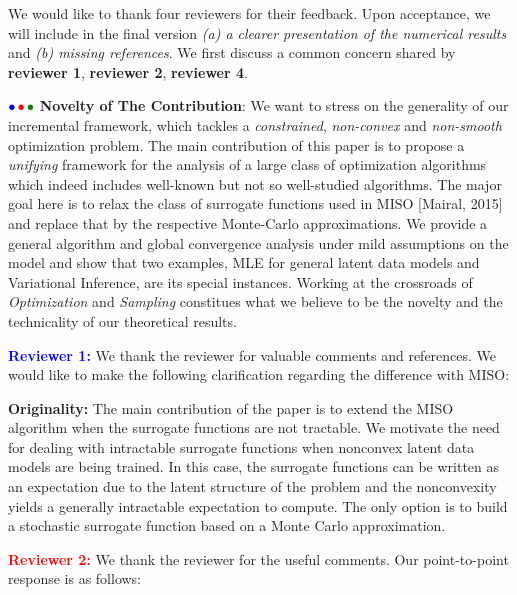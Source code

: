 \documentclass{article}
\begin{document}
We would like to thank four reviewers for their feedback. Upon acceptance, we will include in the final version \emph{{\sf (a)} a clearer presentation of the numerical results} and \emph{{\sf (b)} missing references}. 
We first discuss a common concern shared by \textbf{\color{blue}reviewer 1}, \textbf{\color{red} reviewer 2}, \textbf{\color{green!50!black}reviewer 4}.

${\color{blue}\bullet}\!~{\color{red}\bullet}\!~{\color{green!50!black}\bullet}$ \textbf{Novelty of The Contribution}: 
We want to stress on the generality of our incremental framework, which tackles a \emph{constrained}, \emph{non-convex} and \emph{non-smooth} optimization problem. 
The main contribution of this paper is to propose a \emph{unifying} framework for the analysis of a large class of optimization algorithms which indeed includes well-known but not so well-studied algorithms.
The major goal here is to relax the class of surrogate functions used in MISO [Mairal, 2015] and replace that by the respective Monte-Carlo approximations.
We provide a general algorithm and global convergence analysis under mild assumptions on the model and show that two examples, MLE for general latent data models and Variational Inference, are its special instances.
Working at the crossroads of \emph{Optimization} and \emph{Sampling} constitues what we believe to be the novelty and the technicality of our theoretical results.\vspace{-0.05in}


\textbf{\textcolor{blue}{Reviewer 1:}} We thank the reviewer for valuable comments and references. We would like to make the following clarification regarding the difference with MISO:

\textbf{Originality:} The main contribution of the paper is to extend the MISO algorithm when the surrogate functions are not tractable. 
We motivate the need for dealing with intractable surrogate functions when nonconvex latent data models are being trained. 
In this case, the surrogate functions can be written as an expectation due to the latent structure of the problem and the nonconvexity yields a generally intractable expectation to compute. 
The only option is to build a stochastic surrogate function based on a Monte Carlo approximation.\vspace{-0.05in}


\textbf{\textcolor{red}{Reviewer 2:}} We thank the reviewer for the useful comments. Our point-to-point response is as follows:
\end{document}

